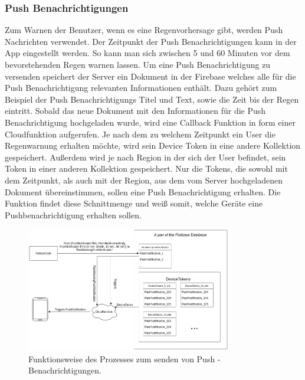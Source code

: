 \subsubsection{Push Benachrichtigungen}\label{sec:Pushbenachrichtigungen}
Zum Warnen der Benutzer, wenn es eine Regenvorhersage gibt, werden Push Nachrichten verwendet. 
Der Zeitpunkt der Push Benachrichtigungen kann in der App eingestellt werden. 
So kann man sich zwischen 5 und 60 Minuten vor dem bevorstehenden Regen warnen lassen.  
Um eine Push Benachrichtigung zu versenden speichert der Server ein Dokument in der Firebase welches alle für die 
Push Benachrichtigung relevanten Informationen enthält. 
Dazu gehört zum Beispiel der Push Benachrichtigungs Titel und Text, sowie die Zeit bis der Regen eintritt.
Sobald das neue Dokument mit den Informationen für die Push Benachrichtigung hochgeladen wurde, wird eine Callback 
Funktion in form einer Cloudfunktion aufgerufen.
Je nach dem zu welchem Zeitpunkt ein User die Regenwarnung erhalten möchte, wird sein Device Token in eine andere 
Kollektion gespeichert.   
Außerdem wird je nach Region in der sich der User befindet, sein Token in einer anderen Kollektion gespeichert. 
Nur die Tokens, die sowohl mit dem Zeitpunkt, als auch mit der Region, aus dem vom Server hochgeladenen Dokument übereinstimmen, 
sollen eine Push Benachrichtigung erhalten. 
Die Funktion findet diese Schnittmenge und weiß somit, welche Geräte eine Pushbenachrichtigung erhalten sollen. 

\begin{figure}[h]
 \centering
 \includegraphics[width=0.8\textwidth,angle=0]{abb/funktionsweise_pushnachrichten_senden}
 \caption[Funktionsweise von Pushbenachrichtigungen]{Funktionsweise des Prozesses zum senden von Push - Benachrichtigungen.}
\label{fig:funktionsweise_pushnachrichten_senden}
\end{figure}

